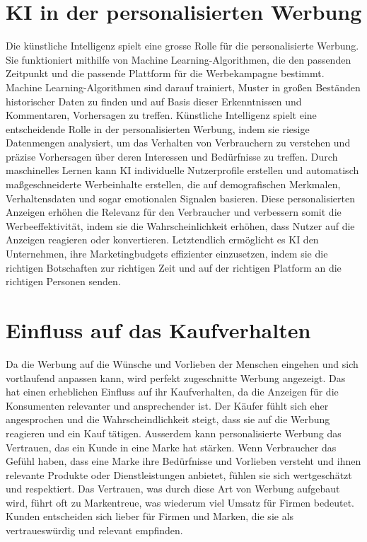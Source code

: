 \documentclass{article}
\begin{document}
 \section{KI in der personalisierten Werbung}

 Die künstliche Intelligenz spielt eine grosse Rolle für die personalisierte Werbung. Sie funktioniert mithilfe von Machine Learning-Algorithmen, die den passenden Zeitpunkt und die passende Plattform für die Werbekampagne bestimmt. Machine Learning-Algorithmen sind darauf trainiert, Muster in großen Beständen historischer Daten zu finden und auf Basis dieser Erkenntnissen und Kommentaren, Vorhersagen zu treffen.
 Künstliche Intelligenz spielt eine entscheidende Rolle in der personalisierten Werbung, indem sie riesige Datenmengen analysiert, um das Verhalten von Verbrauchern zu verstehen und präzise Vorhersagen über deren Interessen und Bedürfnisse zu treffen. Durch maschinelles Lernen kann KI individuelle Nutzerprofile erstellen und automatisch maßgeschneiderte Werbeinhalte erstellen, die auf demografischen Merkmalen, Verhaltensdaten und sogar emotionalen Signalen basieren. Diese personalisierten Anzeigen erhöhen die Relevanz für den Verbraucher und verbessern somit die Werbeeffektivität, indem sie die Wahrscheinlichkeit erhöhen, dass Nutzer auf die Anzeigen reagieren oder konvertieren. Letztendlich ermöglicht es KI den Unternehmen, ihre Marketingbudgets effizienter einzusetzen, indem sie die richtigen Botschaften zur richtigen Zeit und auf der richtigen Platform an die richtigen Personen senden.

 \section{Einfluss auf das Kaufverhalten}
Da die Werbung auf die Wünsche und Vorlieben der Menschen eingehen und sich vortlaufend anpassen kann, wird perfekt zugeschnitte Werbung angezeigt. Das hat einen erheblichen Einfluss auf ihr Kaufverhalten, da die Anzeigen für die Konsumenten relevanter und ansprechender ist. Der Käufer fühlt sich eher angesprochen und die Wahrscheindlichkeit steigt, dass sie auf die Werbung reagieren und ein Kauf tätigen. Ausserdem kann personalisierte Werbung das Vertrauen, das ein Kunde in eine Marke hat stärken. Wenn Verbraucher das Gefühl haben, dass eine Marke ihre Bedürfnisse und Vorlieben versteht und ihnen relevante Produkte oder Dienstleistungen anbietet, fühlen sie sich wertgeschätzt und respektiert. Das Vertrauen, was durch diese Art von Werbung aufgebaut wird, führt oft zu Markentreue, was wiederum viel Umsatz für Firmen bedeutet. Kunden entscheiden sich lieber für Firmen und Marken, die sie als vertraueswürdig und relevant empfinden. 

 
 
 
 
 
  


\printbibliography
\end{document}
